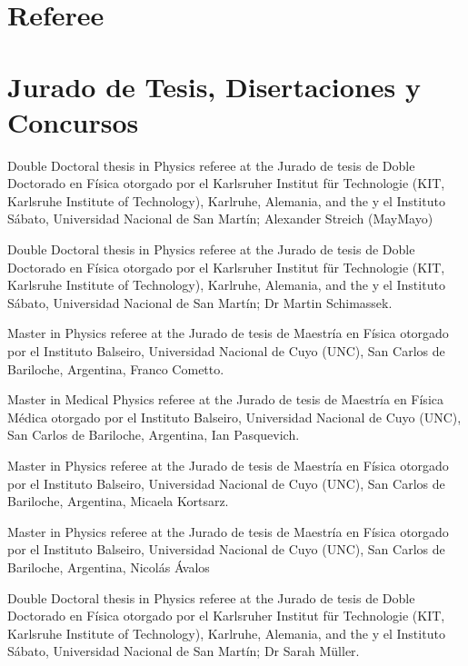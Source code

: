 

\ifeng
  \section*{Referee}
\else
  \section*{Jurado de Tesis, Disertaciones y Concursos}
\fi

\ifeng
Double Doctoral thesis in Physics referee at the
\else
Jurado de tesis de Doble Doctorado en Física otorgado por el
\fi
Karlsruher Institut für Technologie (KIT, Karlsruhe Institute of Technology), Karlruhe, Alemania, \ifeng and the \else y el \fi Instituto Sábato, Universidad Nacional de San Martín; Alexander Streich (\ifeng May\else Mayo)

\ifeng
Double Doctoral thesis in Physics referee at the
\else
Jurado de tesis de Doble Doctorado en Física otorgado por el
\fi
Karlsruher Institut für Technologie (KIT, Karlsruhe Institute of Technology), Karlruhe, Alemania, \ifeng and the \else y el \fi Instituto Sábato, Universidad Nacional de San Martín; Dr Martin Schimassek.

\ifeng
Master in Physics referee at the 
\else
Jurado de tesis de Maestría en Física otorgado por el
\fi
Instituto Balseiro, Universidad Nacional de Cuyo (UNC), San Carlos de Bariloche, Argentina, Franco Cometto. 

\ifeng
Master in Medical Physics referee at the 
\else
Jurado de tesis de Maestría en Física Médica otorgado por el
\fi
Instituto Balseiro, Universidad Nacional de Cuyo (UNC), San Carlos de Bariloche, Argentina, Ian Pasquevich. 

\ifeng
Master in Physics referee at the 
\else
Jurado de tesis de Maestría en Física otorgado por el
\fi
Instituto Balseiro, Universidad Nacional de Cuyo (UNC), San Carlos de Bariloche, Argentina, Micaela Kortsarz. 

\ifeng
Master in Physics referee at the 
\else
Jurado de tesis de Maestría en Física otorgado por el
\fi
Instituto Balseiro, Universidad Nacional de Cuyo (UNC), San Carlos de Bariloche, Argentina, Nicolás Ávalos

\ifeng
Double Doctoral thesis in Physics referee at the
\else
Jurado de tesis de Doble Doctorado en Física otorgado por el
\fi
Karlsruher Institut für Technologie (KIT, Karlsruhe Institute of Technology), Karlruhe, Alemania, \ifeng and the \else y el \fi Instituto Sábato, Universidad Nacional de San Martín; Dr Sarah Müller.

